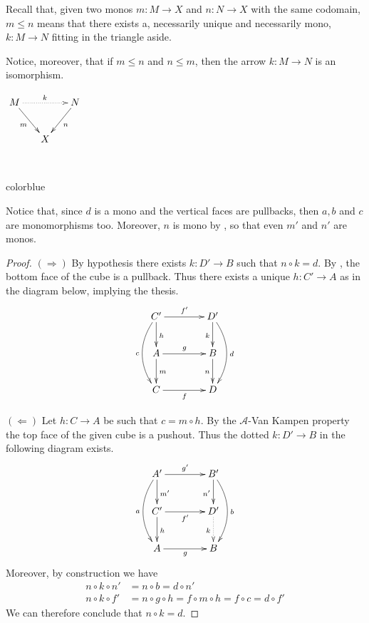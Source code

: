 \documentclass[a4paper,UKenglish,cleveref,pdftex, thm-restate,numberwithinsect,anonymous]{lipics}
\newcommand{\full}[1]{{color{blue}#1}}
\newcommand{\full}[1]{}
\begin{document}
\noindent 
\parbox{11cm}{\begin{remark}
	Recall that, given two monos $m:M\to X$ and $n:N\to X$ with the same codomain, $m\leq n$ means that there exists a, necessarily unique and necessarily mono, $k:M\to N$ fitting in the triangle aside.	
	
	\hspace{15pt}Notice, moreover, that  if $m\leq n$ and $n\leq m$, then the arrow $k:M\to N$ is an isomorphism.
\end{remark}}
\parbox{4cm}{$\xymatrix@C=15pt{M\ar@{.>}[rr]^{k}  \ar[dr]_{m}&& N \ar[dl]^{n}\\ & X}$}\\

\full{ 
\begin{remark}
	Notice that, since $d$ is a mono and the vertical faces are pullbacks, then $a, b$ and $c$ are monomorphisms too. Moreover, $n$ is mono by \Cref{prop:pbpo}, so that even $m'$ and $n'$ are monos.
\end{remark}

\begin{proof}
	$(\Rightarrow)$ By hypothesis there exists $k:D'\to B$ such that $n\circ k = d$. By \Cref{prop:pbpo}, the bottom face of the cube is a pullback. Thus there exists a unique $h:C'\to A$ as in the diagram below, implying the thesis.
	\[\xymatrix@C=40pt{C'  \ar[d]^{h}\ar[r]^{f'} \ar@/_.5cm/[dd]_{c}& D' \ar@/^.5cm/[dd]^{d}\ar[d]_{k}\\ A \ar[d]^{m} \ar[r]^{g} & B \ar[d]_{n} \\  C \ar[r]_f & D}\]

	\smallskip \noindent
	$(\Leftarrow)$ Let $h:C\to A$ be such that $c=m\circ h$. By the $\mathcal{A}$-Van Kampen property the top face of the given cube is a pushout. Thus the dotted $k:D'\to B$ in the following diagram exists.
	\[\xymatrix@C=40pt{A' \ar@/_.5cm/[dd]_{a} \ar[d]^{m'} \ar[r]^{g'} & B' \ar[d]_{n'} \ar@/^.5cm/[dd]^{b} \\  C' \ar[d]^{h} \ar[r]_{f'} & D' \ar@{.>}[d]_{k}\\ A \ar[r]_g& B }\]
	Moreover, by construction we have
	\begin{align*}
		n\circ k \circ n' & = n\circ b=d\circ n'                                  \\
		n\circ k \circ f' & = n\circ g\circ h=f\circ m\circ h=f\circ c= d\circ f'
	\end{align*}
	We can therefore conclude that $n\circ k =d$.
\end{proof}}
\end{document}
